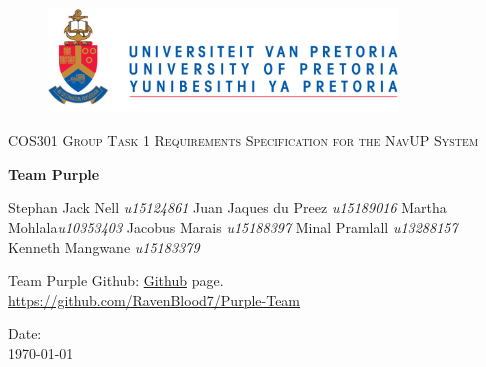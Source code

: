 \begin{titlepage}
	\begin{center}
		\begin{figure}[t]
			\centering
			\includegraphics[width=350px]{logo.PNG}
		\end{figure}
		
		\textsc{\LARGE COS301 Group Task 1 \newline\newline Requirements Specification for the NavUP System}
		
		\textbf{\newline Team Purple} \\
		\begin{flushright} \large
			Stephan Jack Nell \emph{u15124861} \newline
			Juan Jaques du Preez \emph{u15189016} \newline
			Martha Mohlala\emph{u10353403}\newline
			Jacobus Marais \emph{u15188397}\newline
			Minal Pramlall \emph{u13288157}\newline
			Kenneth Mangwane \emph{u15183379}\newline
		\end{flushright}

		\vfill %

		Team Purple Github: \href{https://github.com/RavenBlood7/Purple-Team}{Github} page.\\
\url{https://github.com/RavenBlood7/Purple-Team}

		\vfill
{\large Date:}
\\
{\large \today}

	\end{center}
\end{titlepage}
